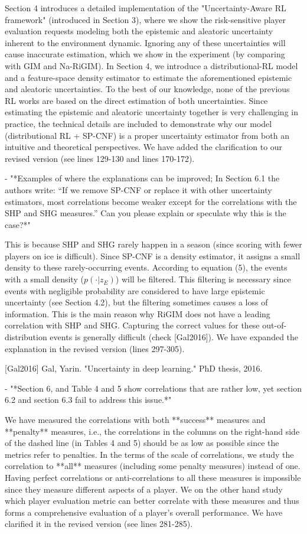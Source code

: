 \documentclass{article}
\begin{document}
Section 4 introduces a detailed implementation of the "Uncertainty-Aware RL framework" (introduced in Section 3), where we show the risk-sensitive player evaluation requests modeling both the epistemic and aleatoric uncertainty inherent to the environment dynamic. Ignoring any of these uncertainties will cause inaccurate estimation, which we show in the experiment (by comparing with GIM and Na-RiGIM). In Section 4, we introduce a distributional-RL model and a feature-space density estimator to estimate the aforementioned epistemic and aleatoric uncertainties. To the best of our knowledge, none of the previous RL works are based on the direct estimation of both uncertainties.
Since estimating the epistemic and aleatoric uncertainty together is very challenging in practice, the technical details are included to demonstrate why our model (distributional RL + SP-CNF) is a proper uncertainty estimator from both an intuitive and theoretical perspectives. We have added the clarification to our revised version (see lines 129-130 and lines 170-172).  

- "*Examples of where the explanations can be improved; In Section 6.1 the authors write: “If we remove SP-CNF or replace it with other uncertainty estimators, most correlations become weaker except for the correlations with the SHP and SHG measures.” Can you please explain or speculate why this is the case?*"

This is because SHP and SHG rarely happen in a season (since scoring with fewer players on ice is difficult). Since SP-CNF is a density estimator, it assigns a small density to these rarely-occurring events. According to equation (5), the events with a small density ($p(\cdot|{z}_{E})$) will be filtered. This filtering is necessary since events with negligible probability are considered to have large epistemic uncertainty (see Section 4.2), but the filtering sometimes causes a loss of information. This is the main reason why RiGIM does not have a leading correlation with SHP and SHG. Capturing the correct values for these out-of-distribution events is generally difficult (check [Gal2016]). We have expanded the explanation in the revised version (lines 297-305).

[Gal2016] Gal, Yarin. "Uncertainty in deep learning." PhD thesis, 2016.

- "*Section 6, and Table 4 and 5 show correlations that are rather low, yet section 6.2 and section 6.3 fail to address this issue.*"

We have measured the correlations with both **success** measures and **penalty** measures, i.e., the correlations in the columns on the right-hand side of the dashed line (in Tables 4 and 5) should be as low as possible since the metrics refer to penalties.  In the terms of the scale of correlations, we study the correlation to **all** measures (including some penalty measures) instead of one. Having perfect correlations or anti-correlations to all these measures is impossible since they measure different aspects of a player. We on the other hand study which player evaluation metric can better correlate with these measures and thus forms a comprehensive evaluation of a player's overall performance.  We have clarified it in the revised version (see lines 281-285).
\end{document}
